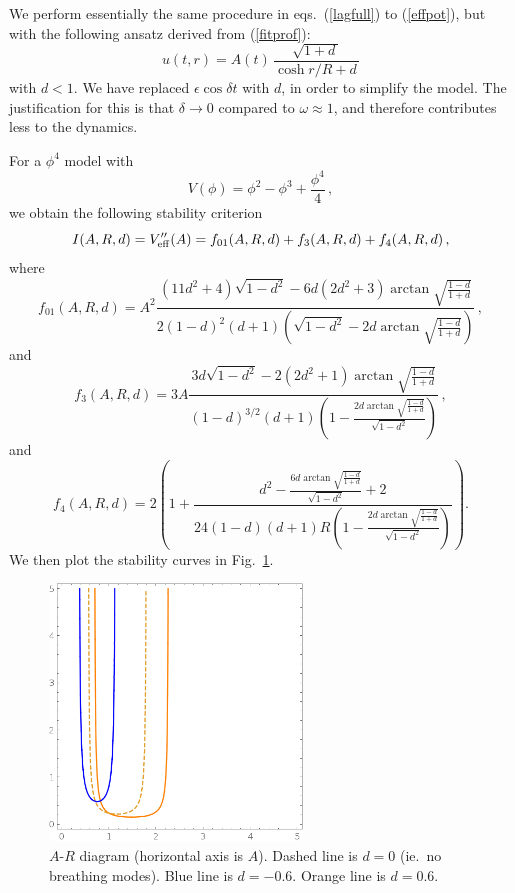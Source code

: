 \documentclass[11pt]{book}
\begin{document}
We perform essentially the same procedure in eqs.~(\ref{lagfull}) to (\ref{effpot}), but with the following ansatz derived from (\ref{fitprof}):
\begin{equation}
  u(t,r) = A(t)\,\frac{\sqrt{1+d\,}}{\cosh r/R + d\,}
\end{equation}
with $d<1$. We have replaced $\epsilon\cos\delta t$ with $d$, in order to simplify the model. The justification for this is that $\delta\to 0$ compared to $\omega\approx 1$, and therefore contributes less to the dynamics.

For a $\phi^4$ model with
\begin{equation}
  V(\phi) = \phi^2 - \phi^3 + \frac{\phi^4}{4}\,,
\end{equation}
we obtain the following stability criterion
\begin{equation}
  I(A,R,d) = V_{\rm eff}''(A) = f_{01}(A,R,d) + f_3(A,R,d) + f_4(A,R,d)\,,
\end{equation}
where
\begin{equation}
  f_{01}(A,R,d)=A^2\frac{\left(11 d^2+4\right) \sqrt{1-d^2}-6 d \left(2 d^2+3\right) \arctan\sqrt{\frac{1-d}{1+d}}}{2 (1-d)^2 (d+1) \left(\sqrt{1-d^2}
      -2 d \arctan\sqrt{\frac{1-d}{1+d}}\right)}\,,
\end{equation}
and
\begin{equation}
  f_3(A,R,d)=3A\frac{3 d \sqrt{1-d^2}-2 \left(2 d^2+1\right) \arctan\sqrt{\frac{1-d}{1+d}}}{(1-d)^{3/2} (d+1) \left(1-\frac{2 d \arctan\sqrt{\frac{1-d}{1+d}}}{\sqrt{1-d^2}}\right)}\,,
\end{equation}
and
\begin{equation}
    f_4(A,R,d)=2 \left(1+\frac{d^2-\frac{6 d \arctan\sqrt{\frac{1-d}{1+d}}}{\sqrt{1-d^2}}+2}{24 (1-d) (d+1) R \left(1-\frac{2 d \arctan\sqrt{\frac{1-d}{1+d}}}{\sqrt{1-d^2}}\right)}\right).
\end{equation}
We then plot the stability curves in Fig.~\ref{stability1}.

\begin{figure}\centering
  \includegraphics[width=0.6\textwidth]{plot/small-stability.png}
  \caption{$A$-$R$ diagram (horizontal axis is $A$). Dashed line is $d=0$ (ie.~no breathing modes). Blue line is $d=-0.6$. Orange line is $d=0.6$.}\label{stability1}
\end{figure}
\end{document}
